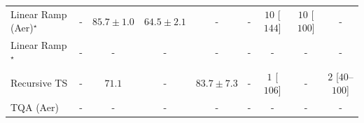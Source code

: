 \begin{tabular}{l|cccc|cccc|}
Linear Ramp (Aer)$^\star$ & {\cellcolor[HTML]{000000}} \color[HTML]{F1F1F1} {\cellcolor{white}} \color{black} - & {\cellcolor[HTML]{DC5E0B}} \color[HTML]{F1F1F1} $85.7\pm 1.0$ & {\cellcolor[HTML]{FFFFE5}} \color[HTML]{000000} $64.5\pm 2.1$ & {\cellcolor[HTML]{000000}} \color[HTML]{F1F1F1} {\cellcolor{white}} \color{black} - & {\cellcolor[HTML]{000000}} \color[HTML]{F1F1F1} {\cellcolor{white}} \color{black} - & {\cellcolor[HTML]{FFF5F1}} \color[HTML]{000000} $10$ [$144$] & {\cellcolor[HTML]{FFF5F1}} \color[HTML]{000000} $10$ [$100$] & {\cellcolor[HTML]{000000}} \color[HTML]{F1F1F1} {\cellcolor{white}} \color{black} - \\
Linear Ramp$^\star$ & {\cellcolor[HTML]{000000}} \color[HTML]{F1F1F1} {\cellcolor{white}} \color{black} - & {\cellcolor[HTML]{000000}} \color[HTML]{F1F1F1} {\cellcolor{white}} \color{black} - & {\cellcolor[HTML]{000000}} \color[HTML]{F1F1F1} {\cellcolor{white}} \color{black} - & {\cellcolor[HTML]{000000}} \color[HTML]{F1F1F1} {\cellcolor{white}} \color{black} - & {\cellcolor[HTML]{000000}} \color[HTML]{F1F1F1} {\cellcolor{white}} \color{black} - & {\cellcolor[HTML]{000000}} \color[HTML]{F1F1F1} {\cellcolor{white}} \color{black} - & {\cellcolor[HTML]{000000}} \color[HTML]{F1F1F1} {\cellcolor{white}} \color{black} - & {\cellcolor[HTML]{000000}} \color[HTML]{F1F1F1} {\cellcolor{white}} \color{black} - \\
Recursive TS & {\cellcolor[HTML]{000000}} \color[HTML]{F1F1F1} {\cellcolor{white}} \color{black} - & {\cellcolor[HTML]{FEE99E}} \color[HTML]{000000} $71.1$ & {\cellcolor[HTML]{000000}} \color[HTML]{F1F1F1} {\cellcolor{white}} \color{black} - & {\cellcolor[HTML]{EC7014}} \color[HTML]{F1F1F1} $83.7\pm 7.3$ & {\cellcolor[HTML]{000000}} \color[HTML]{F1F1F1} {\cellcolor{white}} \color{black} - & {\cellcolor[HTML]{FFF7F3}} \color[HTML]{000000} $1$ [$106$] & {\cellcolor[HTML]{000000}} \color[HTML]{F1F1F1} {\cellcolor{white}} \color{black} - & {\cellcolor[HTML]{FFF7F3}} \color[HTML]{000000} $2$ [$40$--$100$] \\
TQA (Aer) & {\cellcolor[HTML]{000000}} \color[HTML]{F1F1F1} {\cellcolor{white}} \color{black} - & {\cellcolor[HTML]{000000}} \color[HTML]{F1F1F1} {\cellcolor{white}} \color{black} - & {\cellcolor[HTML]{000000}} \color[HTML]{F1F1F1} {\cellcolor{white}} \color{black} - & {\cellcolor[HTML]{000000}} \color[HTML]{F1F1F1} {\cellcolor{white}} \color{black} - & {\cellcolor[HTML]{000000}} \color[HTML]{F1F1F1} {\cellcolor{white}} \color{black} - & {\cellcolor[HTML]{000000}} \color[HTML]{F1F1F1} {\cellcolor{white}} \color{black} - & {\cellcolor[HTML]{000000}} \color[HTML]{F1F1F1} {\cellcolor{white}} \color{black} - & {\cellcolor[HTML]{000000}} \color[HTML]{F1F1F1} {\cellcolor{white}} \color{black} - \\

\end{tabular}
